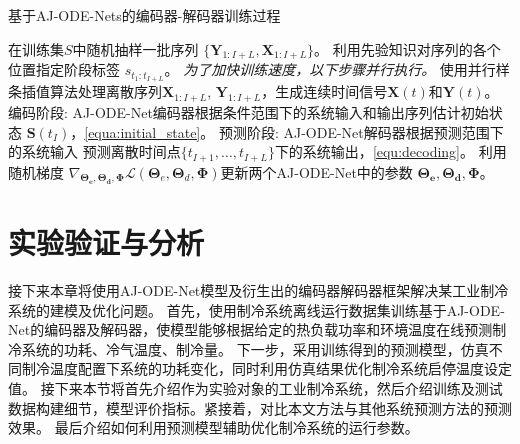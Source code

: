 \begin{algorithm*}[]
\caption{ 基于AJ-ODE-Nets的编码器-解码器训练过程 }
\label{alg:training}
\begin{algorithmic}[1]
\State  在训练集$S$中随机抽样一批序列 $\{\boldsymbol{Y}_{1:I+L}, {\boldsymbol {X}}_{1:I+L}\}$。
\State 利用先验知识对序列的各个位置指定阶段标签 $s_{t_1:t_{I+L}}$。
\State \text{//}\textit{为了加快训练速度，以下步骤并行执行。}
\State 使用并行样条插值算法处理离散序列${\boldsymbol {X}}_{1:I+L}$, $\boldsymbol{Y}_{1:I+L}$，生成连续时间信号$\boldsymbol X(t)$和$\boldsymbol Y(t)$。
\State 编码阶段: AJ-ODE-Net编码器根据条件范围下的系统输入和输出序列估计初始状态 $\boldsymbol{S}\left(t_{I}\right)$，\eqref{equa:initial_state}。
\State 预测阶段: AJ-ODE-Net解码器根据预测范围下的系统输入 预测离散时间点$\{t_{I+1}, \dots, t_{I+L}\}$下的系统输出，\eqref{equ:decoding}。
\State 利用随机梯度 $\nabla_{\boldsymbol{\Theta_{e}}, \boldsymbol{\Theta_{d}}, \boldsymbol \Phi}\mathcal{L}\left(\boldsymbol{\Theta}_{e}, \boldsymbol{\Theta}_{d}, \boldsymbol{\Phi}\right)$更新两个AJ-ODE-Net中的参数 $\boldsymbol{\Theta_{e}}, \boldsymbol{\Theta_{d}}, \boldsymbol \Phi$。
\EndFor
\EndFor
\end{algorithmic}
\end{algorithm*}


\section{实验验证与分析}
\label{sec:4_evalutaion}
接下来本章将使用AJ-ODE-Net模型及衍生出的编码器解码器框架解决某工业制冷系统的建模及优化问题。
首先，使用制冷系统离线运行数据集训练基于AJ-ODE-Net的编码器及解码器，使模型能够根据给定的热负载功率和环境温度在线预测制冷系统的功耗、冷气温度、制冷量。
下一步，采用训练得到的预测模型，仿真不同制冷温度配置下系统的功耗变化，同时利用仿真结果优化制冷系统启停温度设定值。
接下来本节将首先介绍作为实验对象的工业制冷系统，然后介绍训练及测试数据构建细节，模型评价指标。紧接着，对比本文方法与其他系统预测方法的预测效果。
最后介绍如何利用预测模型辅助优化制冷系统的运行参数。


